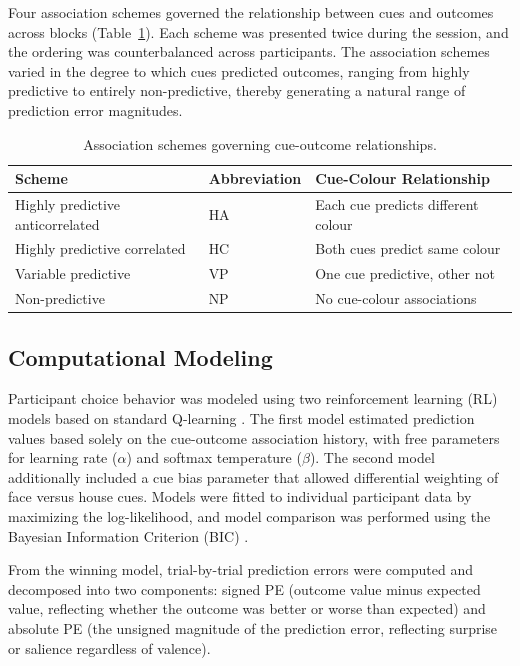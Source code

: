 \documentclass[12pt]{article}
\begin{document}
Four association schemes governed the relationship between cues and outcomes across blocks (Table~\ref{tab:schemes}). Each scheme was presented twice during the session, and the ordering was counterbalanced across participants. The association schemes varied in the degree to which cues predicted outcomes, ranging from highly predictive to entirely non-predictive, thereby generating a natural range of prediction error magnitudes.

\begin{table}[ht]
\centering
\caption{Association schemes governing cue-outcome relationships.}
\label{tab:schemes}
\begin{tabular}{lll}
\toprule
Scheme & Abbreviation & Cue-Colour Relationship \\
\midrule
Highly predictive anticorrelated & HA & Each cue predicts different colour \\
Highly predictive correlated & HC & Both cues predict same colour \\
Variable predictive & VP & One cue predictive, other not \\
Non-predictive & NP & No cue-colour associations \\
\bottomrule
\end{tabular}
\end{table}

\subsection{Computational Modeling}

Participant choice behavior was modeled using two reinforcement learning (RL) models based on standard Q-learning \citep{sutton1998reinforcement, daw2011trial}. The first model estimated prediction values based solely on the cue-outcome association history, with free parameters for learning rate ($\alpha$) and softmax temperature ($\beta$). The second model additionally included a cue bias parameter that allowed differential weighting of face versus house cues. Models were fitted to individual participant data by maximizing the log-likelihood, and model comparison was performed using the Bayesian Information Criterion (BIC) \citep{schwarz1978estimating}.

From the winning model, trial-by-trial prediction errors were computed and decomposed into two components: signed PE (outcome value minus expected value, reflecting whether the outcome was better or worse than expected) and absolute PE (the unsigned magnitude of the prediction error, reflecting surprise or salience regardless of valence).
\end{document}
